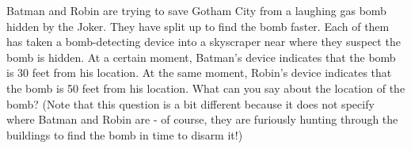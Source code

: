 \documentclass[noauthor,nooutcomes]{ximera}
\begin{document}
\pagebreak

\begin{problem}
Batman and Robin are trying to save Gotham City from a laughing gas bomb hidden by the Joker.  They have split up to find the bomb faster.  Each of them has taken a bomb-detecting device into a skyscraper near where they suspect the bomb is hidden.  At a certain moment, Batman's device indicates that the bomb is 30 feet from his location.  At the same moment, Robin's device indicates that the bomb is 50 feet from his location.  What can you say about the location of the bomb? (Note that this question is a bit different because it does not specify where Batman and Robin are - of course, they are furiously hunting through the buildings to find the bomb in time to disarm it!)
\end{problem}

\pagebreak
\end{document}
